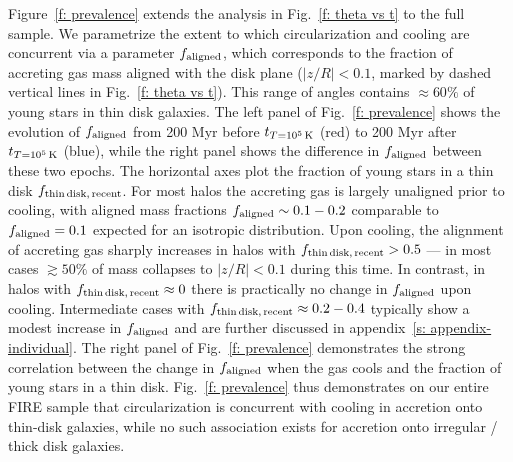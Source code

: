 \documentclass[fleqn,usenatbib]{mnras}
\newcommand{\tcon}{t_{T=10^5\,{\rm K}}}
\begin{document}
Figure~\ref{f: prevalence} extends the analysis in Fig.~\ref{f: theta vs t} to the full sample.
We parametrize the extent to which circularization and cooling are concurrent via a parameter $f_{\rm aligned}$, which corresponds to the fraction of accreting gas mass aligned with the disk plane ($\vert z/R \vert < 0.1$, marked by dashed vertical lines in Fig.~\ref{f: theta vs t}).
This range of angles contains $\approx 60\%$ of young stars in thin disk galaxies.
The left panel of Fig.~\ref{f: prevalence} shows the evolution of $f_{\rm aligned}$ from 200 Myr before $\tcon$ (red) to 200 Myr after $\tcon$ (blue), while the right panel shows the difference in $f_{\rm aligned}$ between these two epochs.
The horizontal axes plot the fraction of young stars in a thin disk $f_{\rm thin\,disk,\,recent}$. 
For most halos the accreting gas is largely unaligned prior to cooling, with aligned mass fractions $f_{\rm aligned}\sim 0.1 - 0.2$ comparable to $f_{\rm aligned} = 0.1$ expected for an isotropic distribution.
Upon cooling, the alignment of accreting gas sharply increases in halos with $f_{\rm thin\,disk,\,recent} > 0.5$ --- in most cases $\gtrsim 50\%$ of mass collapses to $\vert z/R \vert < 0.1$ during this time.
In contrast, in halos with $f_{\rm thin\,disk,\,recent} \approx 0$ there is practically no change in $f_{\rm aligned}$ upon cooling.
Intermediate cases with $f_{\rm thin\,disk,\,recent} \approx 0.2-0.4$ typically show a modest increase in $f_{\rm aligned}$ and are further discussed in appendix~\ref{s: appendix-individual}.
The right panel of Fig.~\ref{f: prevalence} demonstrates the strong correlation between the change in $f_{\rm aligned}$ when the gas cools and the fraction of young stars in a thin disk. 
Fig.~\ref{f: prevalence} thus demonstrates on our entire FIRE sample that circularization is concurrent with cooling in accretion onto thin-disk galaxies, while no such association exists for accretion onto irregular / thick disk galaxies.
\end{document}
